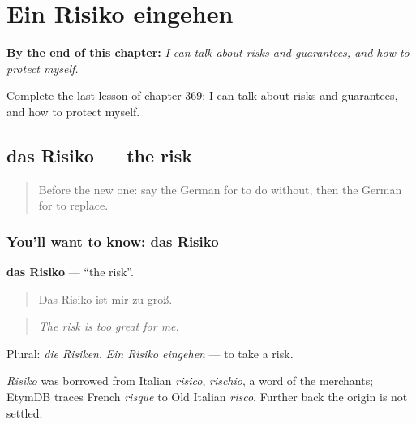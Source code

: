 
\chapter{Ein Risiko eingehen}
\label{ch:ge-ein-risiko-eingehen}

\begin{chapteropening}
\textbf{By the end of this chapter:} \emph{I can talk about risks and guarantees, and how to protect myself.}

Complete the last lesson of chapter 369: I can talk about risks and guarantees, and how to protect myself.
\end{chapteropening}

\section[das Risiko]{das Risiko — the risk}

\label{lesson:GE-C369-risiko}



\begin{quote}
Before the new one: say the German for to do without, then the German for to replace.
\end{quote}

\subsection*{You'll want to know: das Risiko}
\textbf{das Risiko} — \textquotedblleft{}the risk\textquotedblright{}.

\begin{quote}
Das Risiko ist mir zu groß.
\end{quote}

\begin{quote}
\emph{The risk is too great for me.}
\end{quote}

Plural: \emph{die Risiken}. \emph{Ein Risiko eingehen} — to take a risk.

\begin{cousinweb}
\emph{Risiko} was borrowed from Italian \emph{risico}, \emph{rischio}, a word of the merchants; EtymDB traces French \emph{risque} to Old Italian \emph{risco}. Further back the origin is not settled.
\end{cousinweb}

